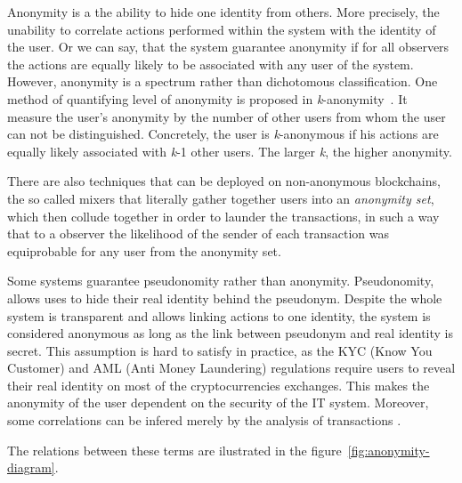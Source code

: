 \documentclass{ieeeaccess}
\begin{document}
Anonymity is a the ability to hide one identity from others. More precisely, the unability to correlate actions performed within the system with the identity of the user. Or we can say, that the system guarantee anonymity if for all observers the actions are equally likely to be associated with any user of the system. However, anonymity is a spectrum rather than dichotomous classification. One method of quantifying level of anonymity is proposed in \textit{k}-anonymity~\cite{sweeney2002k}. It measure the user's anonymity by the number of other users from whom the user can not be distinguished. Concretely, the user is \textit{k}-anonymous if his actions are equally likely associated with \textit{k}-1 other users. The larger \textit{k}, the higher anonymity.

There are also techniques that can be deployed on non-anonymous blockchains, the so called mixers that literally gather together users into an \textit{anonymity set}, which then collude together in order to launder the transactions, in such a way that to a observer the likelihood of the sender of each transaction was equiprobable for any user from the anonymity set.

Some systems guarantee pseudonomity rather than anonymity. Pseudonomity, allows uses to hide their real identity behind the pseudonym. Despite the whole system is transparent and allows linking actions to one identity, the system is considered anonymous as long as the link between pseudonym and real identity is secret. This assumption is hard to satisfy in practice, as the KYC (Know You Customer) and AML (Anti Money Laundering) regulations require users to reveal their real identity on most of the cryptocurrencies exchanges. This makes the anonymity of the user dependent on the security of the IT system. Moreover, some correlations can be infered merely by the analysis of transactions \cite{androulaki2013evaluating, ober2013structure}.

The relations between these terms are ilustrated in the figure~\ref{fig:anonymity-diagram}.
\end{document}
